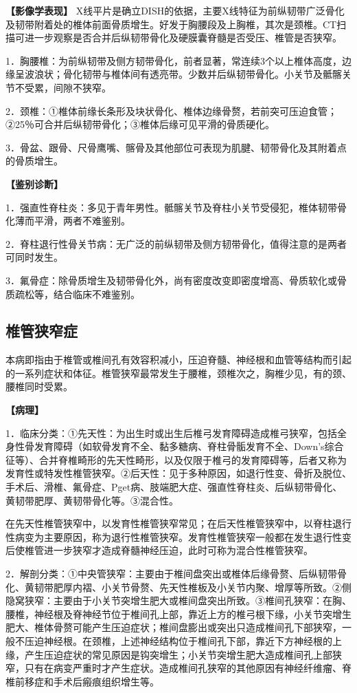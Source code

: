 \textbf{【影像学表现】}
X线平片是确立DISH的依据，主要X线特征为前纵韧带广泛骨化及韧带附着处的椎体前面骨质增生。好发于胸腰段及上胸椎，其次是颈椎。CT扫描可进一步观察是否合并后纵韧带骨化及硬膜囊脊髓是否受压、椎管是否狭窄。

1．胸腰椎：为前纵韧带及侧方韧带骨化，前者显著，常连续3个以上椎体高度，边缘呈波浪状；骨化韧带与椎体间有透亮带。少数并后纵韧带骨化。小关节及骶髂关节不受累，间隙不狭窄。

2．颈椎：①椎体前缘长条形及块状骨化、椎体边缘骨赘，若前突可压迫食管；②25％可合并后纵韧带骨化；③椎体后缘可见平滑的骨质硬化。

3．骨盆、跟骨、尺骨鹰嘴、髂骨及其他部位可表现为肌腱、韧带骨化及其附着点的骨质增生。

\textbf{【鉴别诊断】}

1．强直性脊柱炎：多见于青年男性。骶髂关节及脊柱小关节受侵犯，椎体韧带骨化薄而平滑，两者不难鉴别。

2．脊柱退行性骨关节病：无广泛的前纵韧带及侧方韧带骨化，值得注意的是两者可同时发生。

3．氟骨症：除骨质增生及韧带骨化外，尚有密度改变即密度增高、骨质软化或骨质疏松等，结合临床不难鉴别。

\subsection{椎管狭窄症}

本病即指由于椎管或椎间孔有效容积减小，压迫脊髓、神经根和血管等结构而引起的一系列症状和体征。椎管狭窄最常发生于腰椎，颈椎次之，胸椎少见，有的颈、腰椎同时受累。

\textbf{【病理】}

1．临床分类：①先天性：为出生时或出生后椎弓发育障碍造成椎弓狭窄，包括全身性骨发育障碍（如软骨发育不全、黏多糖病、脊柱骨骺发育不全、Down's综合征等）、合并脊椎畸形的先天性畸形，以及仅限于椎弓的发育障碍等，后者又称为发育性或特发性椎管狭窄。②后天性：见于多种原因，如退行性变、骨折及脱位、手术后、滑椎、氟骨症、Pget病、肢端肥大症、强直性脊柱炎、后纵韧带骨化、黄韧带肥厚、黄韧带骨化等。③混合性。

在先天性椎管狭窄中，以发育性椎管狭窄常见；在后天性椎管狭窄中，以脊柱退行性病变为主要原因，称为退行性椎管狭窄。发育性椎管狭窄一般都在发生退行性变后使椎管进一步狭窄才造成脊髓神经压迫，此时可称为混合性椎管狭窄。

2．解剖分类：①中央管狭窄：主要由于椎间盘突出或椎体后缘骨赘、后纵韧带骨化、黄韧带肥厚内褶、小关节骨赘、先天性椎板及小关节内聚、增厚等所致。②侧隐窝狭窄：主要由于小关节突增生肥大或椎间盘突出所致。③椎间孔狭窄：在胸、腰椎，神经根及脊神经节位于椎间孔上部，靠近上方的椎弓根下缘，小关节突增生肥大、椎体骨赘可能产生压迫症状；椎间盘膨出或突出只造成椎间孔下部狭窄，一般不压迫神经根。在颈椎，上述神经结构位于椎间孔下部，靠近下方神经根的上缘，产生压迫症状的常见原因是钩突增生；小关节突增生肥大造成椎间孔上部狭窄，只有在病变严重时才产生症状。造成椎间孔狭窄的其他原因有神经纤维瘤、脊椎前移症和手术后瘢痕组织增生等。

